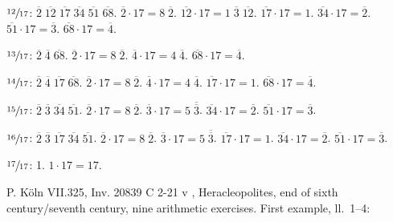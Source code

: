 \documentclass{article}
\theoremstyle{definition}
\begin{document}
$\sfrac{12}{17}$: $\overline{2} \; \overline{12} \; \overline{17} \; \overline{34} \; \overline{51} \; \overline{68}$.
$\overline{2} \cdot 17 = 8 \; \overline{2}$.
$\overline{12} \cdot 17 = 1 \; \overline{3} \; \overline{12}$.
$\overline{17} \cdot 17 = 1$.
$\overline{34} \cdot 17 = \overline{2}$.
$\overline{51} \cdot 17 = \overline{3}$.
$\overline{68} \cdot 17 = \overline{4}$.

$\sfrac{13}{17}$: $\overline{2} \; \overline{4} \; \overline{68}$.
$\overline{2} \cdot 17 = 8 \; \overline{2}$.
$\overline{4} \cdot 17 = 4 \; \overline{4}$.
$\overline{68} \cdot 17 = \overline{4}$.

$\sfrac{14}{17}$: $\overline{2} \; \overline{4} \; \overline{17} \; \overline{68}$.
$\overline{2} \cdot 17 = 8 \; \overline{2}$.
$\overline{4} \cdot 17 = 4 \; \overline{4}$.
$\overline{17} \cdot 17 = 1$.
$\overline{68} \cdot 17 = \overline{4}$.

$\sfrac{15}{17}$: $\overline{2} \; \overline{3} \; \overline{34} \; \overline{51}$.
$\overline{2} \cdot 17 = 8 \; \overline{2}$.
$\overline{3} \cdot 17 = 5 \; \overline{\overline{3}}$.
$\overline{34} \cdot 17 = \overline{2}$.
$\overline{51} \cdot 17 = \overline{3}$.

$\sfrac{16}{17}$: $\overline{2} \; \overline{3} \; \overline{17} \; \overline{34} \; \overline{51}$.
$\overline{2} \cdot 17 = 8 \; \overline{2}$.
$\overline{3} \cdot 17 = 5 \; \overline{\overline{3}}$.
$\overline{17} \cdot 17 = 1$.
$\overline{34} \cdot 17 = \overline{2}$.
$\overline{51} \cdot 17 = \overline{3}$.

$\sfrac{17}{17}$: 1.
$1 \cdot 17= 17$.









P. K\"oln VII.325, Inv. 20839 C 2-21 v \cite[pp.~166--174]{koln7}, Heracleopolites, end of sixth century/seventh century, nine arithmetic exercises.
First example, ll.~1--4:
\end{document}
